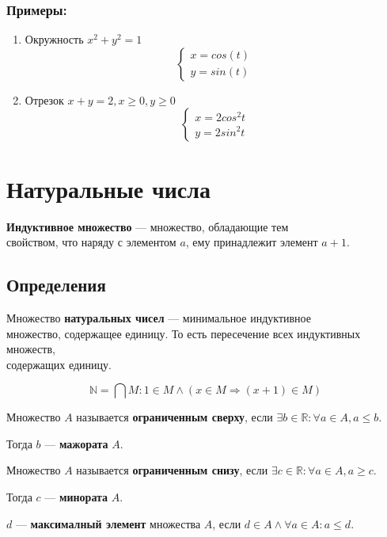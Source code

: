 \documentclass{article}
\begin{document}
\subsubsection*{Примеры:}

\begin{enumerate}
	\item Окружность $x^2 + y^2 = 1$
	\[
	\begin{cases}
		x = cos(t) \\
		y = sin(t)
	\end{cases}
	\]
	\item Отрезок $x + y = 2, x \ge 0, y \ge 0$
	\[
	\begin{cases}
		x = 2 cos^2 t \\
		y = 2 sin^2 t
	\end{cases}
	\]
\end{enumerate}

\section{Натуральные числа}

\textbf{Индуктивное множество} --- множество, обладающие тем \\
свойством, что наряду с элементом $a$, ему принадлежит элемент $a + 1$.

\subsection{Определения}

Множество \textbf{натуральных чисел} --- минимальное индуктивное \\
множество, содержащее единицу. То есть пересечение всех индуктивных множеств, \\
содержащих единицу.

\[
\mathbb{N} = \bigcap M : 1 \in M \land (x \in M \Rightarrow (x + 1) \in M)
\]

Множество $A$ называется \textbf{ограниченным сверху}, если $\exists b \in \mathbb{R} : \forall a \in A, a \le b$.

Тогда $b$ --- \textbf{мажората} $A$.

Множество $A$ называется \textbf{ограниченным снизу}, если $\exists c \in \mathbb{R} : \forall a \in A, a \ge c$.

Тогда $c$ --- \textbf{минората} $A$.

$d$ --- \textbf{максималный элемент} множества $A$, если $d \in A \land \forall a \in A : a \le d$.
\end{document}
